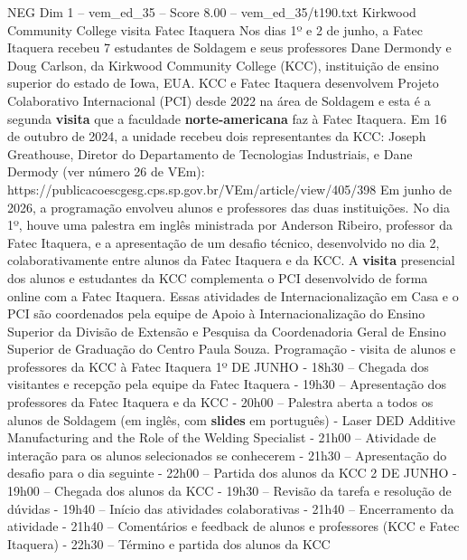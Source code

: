 \begin{textsample}{NEG Dim 1 – vem\_ed\_35 – Score 8.00 – vem\_ed\_35/t190.txt}  \label{ex:f1_neg_174}
Kirkwood Community College visita Fatec Itaquera Nos dias 1º e 2 de junho, a Fatec Itaquera recebeu 7 estudantes de Soldagem e seus professores Dane Dermondy e Doug Carlson, da Kirkwood Community College (KCC), instituição de ensino superior do estado de Iowa, EUA.
KCC e Fatec Itaquera desenvolvem Projeto Colaborativo Internacional (PCI) desde 2022 na área de Soldagem e esta é a segunda \textbf{visita} que a faculdade \textbf{norte-americana} faz à Fatec Itaquera.
Em 16 de outubro de 2024, a unidade recebeu dois representantes da KCC: Joseph Greathouse, Diretor do Departamento de Tecnologias Industriais, e Dane Dermody (ver número 26 de VEm): https://publicacoescgesg.cps.sp.gov.br/VEm/article/view/405/398 Em junho de 2026, a programação envolveu alunos e professores das duas instituições.
No dia 1º, houve uma palestra em inglês ministrada por Anderson Ribeiro, professor da Fatec Itaquera, e a apresentação de um desafio técnico, desenvolvido no dia 2, colaborativamente entre alunos da Fatec Itaquera e da KCC.
A \textbf{visita} presencial dos alunos e estudantes da KCC complementa o PCI desenvolvido de forma online com a Fatec Itaquera.
Essas atividades de Internacionalização em Casa e o PCI são coordenados pela equipe de Apoio à Internacionalização do Ensino Superior da Divisão de Extensão e Pesquisa da Coordenadoria Geral de Ensino Superior de Graduação do Centro Paula Souza.
Programação - visita de alunos e professores da KCC à Fatec Itaquera 1º DE JUNHO - 18h30 – Chegada dos visitantes e recepção pela equipe da Fatec Itaquera - 19h30 – Apresentação dos professores da Fatec Itaquera e da KCC - 20h00 – Palestra aberta a todos os alunos de Soldagem (em inglês, com \textbf{slides} em português) - Laser DED Additive Manufacturing and the Role of the Welding Specialist - 21h00 – Atividade de interação para os alunos selecionados se conhecerem - 21h30 – Apresentação do desafio para o dia seguinte - 22h00 – Partida dos alunos da KCC 2 DE JUNHO - 19h00 – Chegada dos alunos da KCC - 19h30 – Revisão da tarefa e resolução de dúvidas - 19h40 – Início das atividades colaborativas - 21h40 – Encerramento da atividade - 21h40 – Comentários e feedback de alunos e professores (KCC e Fatec Itaquera) - 22h30 – Término e partida dos alunos da KCC

\end{textsample}
